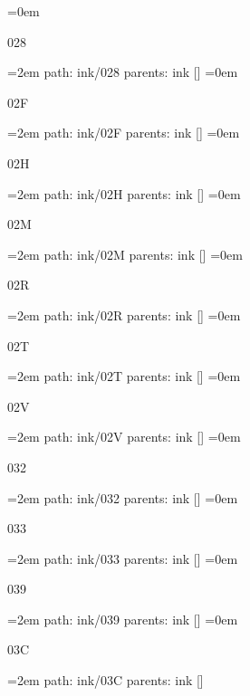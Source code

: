 \leftskip=0em
\par\endgroup
\bigskip
{}
028
\smallskip
\par\begingroup
\leftskip=2em
path: ink/028
\smallskip
parents:  ink []
\smallskip
\leftskip=0em
\par\endgroup
\bigskip
{}
02F
\smallskip
\par\begingroup
\leftskip=2em
path: ink/02F
\smallskip
parents:  ink []
\smallskip
\leftskip=0em
\par\endgroup
\bigskip
{}
02H
\smallskip
\par\begingroup
\leftskip=2em
path: ink/02H
\smallskip
parents:  ink []
\smallskip
\leftskip=0em
\par\endgroup
\bigskip
{}
02M
\smallskip
\par\begingroup
\leftskip=2em
path: ink/02M
\smallskip
parents:  ink []
\smallskip
\leftskip=0em
\par\endgroup
\bigskip
{}
02R
\smallskip
\par\begingroup
\leftskip=2em
path: ink/02R
\smallskip
parents:  ink []
\smallskip
\leftskip=0em
\par\endgroup
\bigskip
{}
02T
\smallskip
\par\begingroup
\leftskip=2em
path: ink/02T
\smallskip
parents:  ink []
\smallskip
\leftskip=0em
\par\endgroup
\bigskip
{}
02V
\smallskip
\par\begingroup
\leftskip=2em
path: ink/02V
\smallskip
parents:  ink []
\smallskip
\leftskip=0em
\par\endgroup
\bigskip
{}
032
\smallskip
\par\begingroup
\leftskip=2em
path: ink/032
\smallskip
parents:  ink []
\smallskip
\leftskip=0em
\par\endgroup
\bigskip
{}
033
\smallskip
\par\begingroup
\leftskip=2em
path: ink/033
\smallskip
parents:  ink []
\smallskip
\leftskip=0em
\par\endgroup
\bigskip
{}
039
\smallskip
\par\begingroup
\leftskip=2em
path: ink/039
\smallskip
parents:  ink []
\smallskip
\leftskip=0em
\par\endgroup
\bigskip
{}
03C
\smallskip
\par\begingroup
\leftskip=2em
path: ink/03C
\smallskip
parents:  ink []
